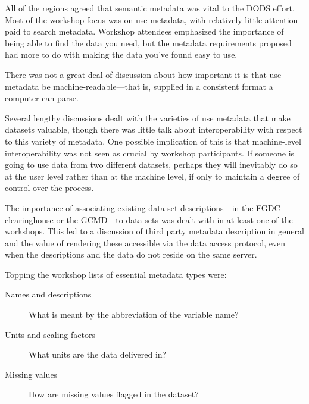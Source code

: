 \documentclass{report}
\begin{document}
All of the regions agreed that semantic metadata was vital to the DODS
effort.  Most of the workshop focus was on use metadata, with
relatively little attention paid to search metadata.  Workshop
attendees emphasized the importance of being able to find the data you
need, but the metadata requirements proposed had more to do with
making the data you've found easy to use.

There was not a great deal of discussion about how important it is
that use metadata be machine-readable---that is, supplied in a
consistent format a computer can parse.  


Several lengthy discussions dealt with the varieties of use metadata
that make datasets valuable, though there was little talk about
interoperability with respect to this variety of metadata.  One
possible implication of this is that machine-level interoperability
was not seen as crucial by workshop participants.  If someone is going
to use data from two different datasets, perhaps they will inevitably
do so at the user level rather than at the machine level, if only to
maintain a degree of control over the process.

The importance of associating existing data set descriptions---in the
FGDC clearinghouse or the GCMD---to data sets was dealt with in at
least one of the workshops.  This led to a discussion of third party
metadata description in general and the value of rendering these
accessible via the data access protocol, even when the descriptions
and the data do not reside on the same server.

Topping the workshop lists of essential metadata types were:

\begin{description}
\item[Names and descriptions] What is meant by the abbreviation of the
  variable name?
\item[Units and scaling factors] What units are the data delivered in?
\item[Missing values] How are missing values flagged in the dataset?
\end{description}
\end{document}
